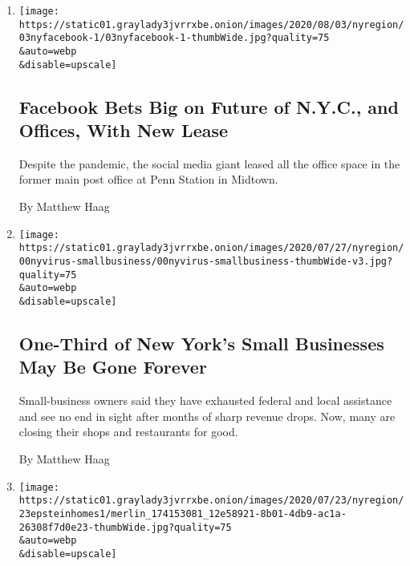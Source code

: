 \begin{enumerate}
\def\labelenumi{\arabic{enumi}.}
\item
  \href{/2020/08/03/nyregion/facebook-nyc-office-farley-building.html}{}

  \texttt{[image: https://static01.graylady3jvrrxbe.onion/images/2020/08/03/nyregion/03nyfacebook-1/03nyfacebook-1-thumbWide.jpg?quality=75\\\&auto=webp\\\&disable=upscale]}

  \hypertarget{facebook-bets-big-on-future-of-nyc-and-offices-with-new-lease}{%
  \subsection{Facebook Bets Big on Future of N.Y.C., and Offices, With
  New
  Lease}\label{facebook-bets-big-on-future-of-nyc-and-offices-with-new-lease}}

  Despite the pandemic, the social media giant leased all the office
  space in the former main post office at Penn Station in Midtown.

  By Matthew Haag
\item
  \href{/2020/08/03/nyregion/nyc-small-businesses-closing-coronavirus.html}{}

  \texttt{[image: https://static01.graylady3jvrrxbe.onion/images/2020/07/27/nyregion/00nyvirus-smallbusiness/00nyvirus-smallbusiness-thumbWide-v3.jpg?quality=75\\\&auto=webp\\\&disable=upscale]}

  \hypertarget{one-third-of-new-yorks-small-businesses-may-be-gone-forever}{%
  \subsection{One-Third of New York's Small Businesses May Be Gone
  Forever}\label{one-third-of-new-yorks-small-businesses-may-be-gone-forever}}

  Small-business owners said they have exhausted federal and local
  assistance and see no end in sight after months of sharp revenue
  drops. Now, many are closing their shops and restaurants for good.

  By Matthew Haag
\item
  \href{/2020/07/23/nyregion/jeffrey-epstein-address-homes.html}{}

  \texttt{[image: https://static01.graylady3jvrrxbe.onion/images/2020/07/23/nyregion/23epsteinhomes1/merlin\_174153081\_12e58921-8b01-4db9-ac1a-26308f7d0e23-thumbWide.jpg?quality=75\\\&auto=webp\\\&disable=upscale]}

  \hypertarget{epstein-mansions-in-new-york-and-palm-beach-for-sale-for-110-million}{%
}
\end{enumerate}
